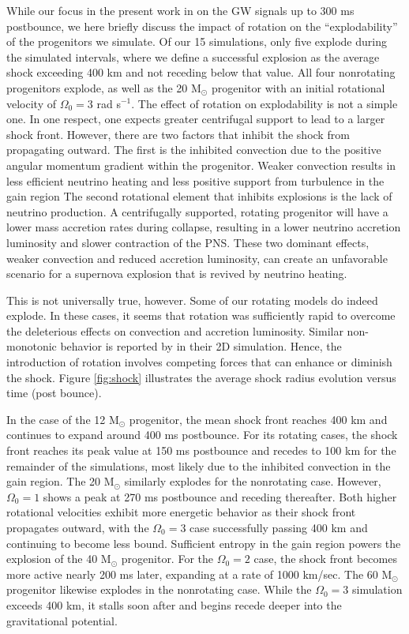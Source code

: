 \documentclass[twocolumn,times]{aastex62}  %
\newcommand{\Msun}{\ensuremath{\mathrm{M}_\odot}\xspace}
\begin{document}
While our focus in the present work in on the GW signals up to 300 ms postbounce, we here briefly discuss the impact of rotation on the ``explodability'' of the progenitors we simulate.   
Of our 15 simulations, only five explode during the simulated intervals, where we define a successful explosion as the average shock exceeding 400 km and not receding below that value.  All four nonrotating progenitors explode, as well as the 20 \Msun progenitor with an initial rotational velocity of $\Omega_0 = 3$ rad s$^{-1}$.  
The effect of rotation on explodability is not a simple one. 
In one respect, one expects greater centrifugal support to lead to a larger shock front.  However, there are two factors that inhibit the shock from propagating outward.  The first is the inhibited convection due to the positive angular momentum gradient within the progenitor. Weaker convection results in less efficient neutrino heating \citep{dolence:2013, murphy:2013} and less positive support from turbulence in the gain region \citep{couch:2015a, mabanta:2018}  The  second rotational element that inhibits explosions is the lack of neutrino production.  A centrifugally supported, rotating progenitor will have a lower mass accretion rates during collapse, resulting in a lower neutrino accretion luminosity and slower contraction of the PNS. 
These two dominant effects, weaker convection and reduced accretion luminosity, can create an unfavorable scenario for a supernova explosion that is revived by neutrino heating.

This is not universally true, however. 
Some of our rotating models do indeed explode. 
In these cases, it seems that rotation was sufficiently rapid to overcome the deleterious effects on convection and accretion luminosity.
Similar non-monotonic behavior is reported by \citet{summa:2018} in their 2D simulation.
Hence, the introduction of rotation involves competing forces that can enhance or diminish the shock.  Figure \ref{fig:shock} illustrates the average shock radius evolution versus time (post bounce).

In the case of the 12 \Msun progenitor, the mean shock front reaches 400 km and continues to expand around 400 ms postbounce.  For its rotating cases, the shock front reaches its peak value at 150 ms postbounce and recedes to 100 km for the remainder of the simulations, most likely due to the inhibited convection in the gain region.  The 20 \Msun similarly explodes for the nonrotating case.  However, $\Omega_0 = 1$ shows a peak at 270 ms postbounce and receding thereafter.  Both higher rotational velocities exhibit more energetic behavior as their shock front propagates outward, with the $\Omega_0 = 3$ case successfully passing 400 km and continuing to become less bound.  Sufficient entropy in the gain region powers the explosion of the 40 \Msun progenitor.  For the $\Omega_0 = 2$ case, the shock front becomes more active nearly 200 ms later, expanding at a rate of 1000 km/sec.  The 60 \Msun progenitor likewise explodes in the nonrotating case.  While the $\Omega_0 = 3$ simulation exceeds 400 km, it stalls soon after and begins recede deeper into the gravitational potential.  
\end{document}
